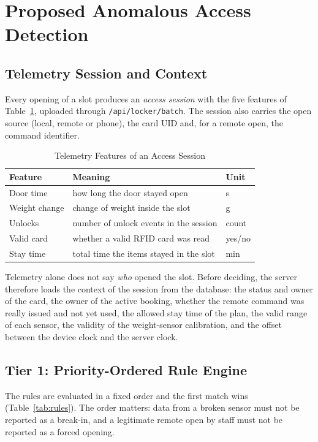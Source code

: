 \documentclass[conference, onecolumn]{IEEEtran}
\begin{document}
\section{Proposed Anomalous Access Detection}

\subsection{Telemetry Session and Context}

Every opening of a slot produces an \emph{access session} with the five features of Table~\ref{tab:features},
uploaded through \texttt{/api/locker/batch}. The session also carries the open source (local, remote or phone), the card UID and, for a
remote open, the command identifier.

\begin{table}[H]
\renewcommand{\arraystretch}{1.3}
\centering
\caption{Telemetry Features of an Access Session}
\label{tab:features}
\begin{tabular}{l l l}
\hline
\textbf{Feature} & \textbf{Meaning} & \textbf{Unit} \\
\hline
Door time   & how long the door stayed open           & s \\
Weight change & change of weight inside the slot      & g \\
Unlocks     & number of unlock events in the session  & count \\
Valid card  & whether a valid RFID card was read      & yes/no \\
Stay time   & total time the items stayed in the slot & min \\
\hline
\end{tabular}
\end{table}

Telemetry alone does not say \emph{who} opened the slot. Before deciding, the server therefore loads the context of
the session from the database: the status and owner of the card, the owner of the active booking, whether the remote
command was really issued and not yet used, the allowed stay time of the plan, the valid range of each sensor, the
validity of the weight-sensor calibration, and the offset between the device clock and the server clock.

\subsection{Tier 1: Priority-Ordered Rule Engine}

The rules are evaluated in a fixed order and the first match wins (Table~\ref{tab:rules}). The order matters: data from
a broken sensor must not be reported as a break-in, and a legitimate remote open by staff must not be reported as a
forced opening.
\end{document}
